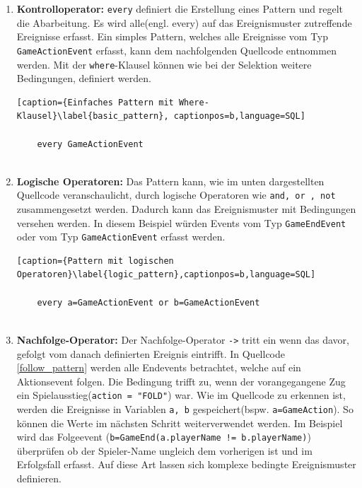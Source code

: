 \begin{enumerate}
	\item \textbf{Kontrolloperator:} \texttt{every} definiert die Erstellung eines Pattern und regelt die Abarbeitung. Es wird alle(engl. every) auf das Ereignismuster zutreffende Ereignisse erfasst. Ein simples Pattern, welches alle Ereignisse vom Typ \texttt{GameActionEvent} erfasst, kann dem nachfolgenden Quellcode entnommen werden.
	Mit der \texttt{where}-Klausel können wie bei der Selektion weitere Bedingungen, definiert werden.
	
	\begin{lstlisting}[caption={Einfaches Pattern mit Where-Klausel}\label{basic_pattern}, captionpos=b,language=SQL]
	
	every GameActionEvent
	
	\end{lstlisting}
	
	\item \textbf{Logische Operatoren:} 
	Das Pattern kann, wie im unten dargestellten Quellcode veranschaulicht, durch logische Operatoren wie \texttt{and, or , not} zusammengesetzt werden. Dadurch kann das Ereignismuster mit Bedingungen versehen werden. In diesem Beispiel würden Events vom Typ \texttt{GameEndEvent} oder vom Typ \texttt{GameActionEvent} erfasst werden.
	
	\begin{lstlisting}[caption={Pattern mit logischen Operatoren}\label{logic_pattern},captionpos=b,language=SQL]
	
	every a=GameActionEvent or b=GameActionEvent
	
	\end{lstlisting}
	
	\item \textbf{Nachfolge-Operator:}
	Der Nachfolge-Operator \texttt{->} tritt ein wenn das davor, gefolgt vom danach definierten Ereignis eintrifft. In Quellcode \ref{follow_pattern}  werden alle Endevents betrachtet, welche auf ein Aktionsevent folgen. Die Bedingung trifft zu, wenn der vorangegangene Zug ein Spielausstieg(\texttt{action = "FOLD"}) war.
	Wie im Quellcode zu erkennen ist, werden die Ereignisse in Variablen \texttt{a, b} gespeichert(bspw. \texttt{a=GameAction}). So können die Werte im nächsten Schritt weiterverwendet werden. Im Beispiel wird das Folgeevent (\texttt{b=GameEnd(a.playerName != b.playerName)}) überprüfen ob der Spieler-Name ungleich dem vorherigen ist und im Erfolgsfall erfasst. Auf diese Art lassen sich komplexe bedingte Ereignismuster definieren.
	

\end{enumerate}
